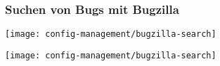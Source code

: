 \subsubsection{Suchen von Bugs mit Bugzilla}
\ifslides
\begin{center}
\texttt{[image: config-management/bugzilla-search]}
\end{center}
\else
\texttt{[image: config-management/bugzilla-search]}
\fi

